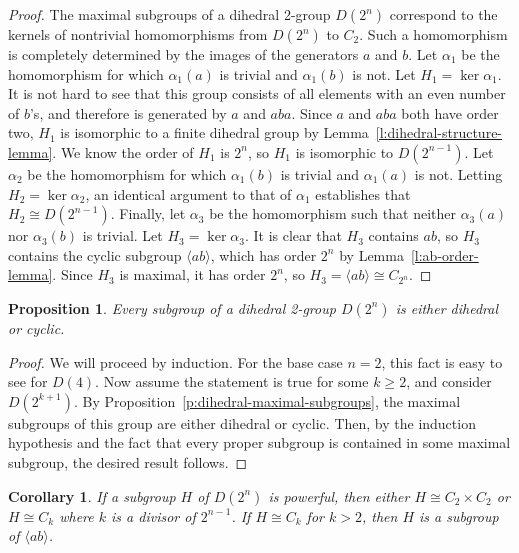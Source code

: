 \documentclass{amsart}
\numberwithin{equation} {section}
\newtheorem{proposition}[equation]{Proposition}
\newtheorem{corollary}[equation]{Corollary}
\theoremstyle{definition}
\begin{document}
\begin{proof}
The maximal subgroups of a dihedral 2-group $D(2^n)$ correspond to  the kernels of nontrivial homomorphisms from $D(2^n)$ to $C_2$. Such a homomorphism is completely determined by the images of the generators $a$ and $b$. Let $\alpha_1$ be the homomorphism for which $\alpha_1(a)$ is trivial and $\alpha_1(b)$ is not. Let $H_1 = \ker \alpha_1$. It is not hard to see that this group consists of all elements with an even number of $b$'s, and therefore is generated by $a$ and $aba$. Since $a$ and $aba$ both have order two, $H_1$ is isomorphic to a finite dihedral group by Lemma~\ref{l:dihedral-structure-lemma}. We know the order of $H_1$ is $2^n$, so $H_1$ is isomorphic to $D(2^{n-1})$. Let $\alpha_2$ be the homomorphism for which $\alpha_1(b)$ is trivial and $\alpha_1(a)$ is not. Letting $H_2 = \ker \alpha_2$, an identical argument to that of $\alpha_1$ establishes that $H_2 \cong D(2^{n-1})$. Finally, let $\alpha_3$ be the homomorphism such that neither $\alpha_3(a)$ nor $\alpha_3(b)$ is trivial. Let $H_3 = \ker \alpha_3$. It is clear that $H_3$ contains $ab$, so $H_3$ contains the cyclic subgroup $\langle ab \rangle$, which has order $2^n$ by Lemma~\ref{l:ab-order-lemma}. Since $H_3$ is maximal, it has order $2^n$, so $H_3 = \langle ab \rangle \cong C_{2^n}$. 
\end{proof}


\begin{proposition}\label{p:dihedral-or-cyclic}
Every subgroup of a dihedral 2-group $D(2^n)$ is either dihedral or cyclic.
\end{proposition}

\begin{proof}
We will proceed by induction. For the base case $n = 2$, this fact is easy to see for $D(4)$. Now assume the statement is true for some $k \geq 2$, and consider $D(2^{k+1})$. By Proposition~\ref{p:dihedral-maximal-subgroups}, the maximal subgroups of this group are either dihedral or cyclic. Then, by the induction hypothesis and the fact that every proper subgroup is contained in some maximal subgroup, the desired result follows. 
\end{proof}


\begin{corollary}\label{c:powerful-isomorphism-types} 
If a subgroup $H$ of $D(2^n)$ is powerful, then either $H\cong C_2\times C_2$ or $H\cong C_k$ where $k $ is a divisor of $2^{n-1}$. If $H \cong C_k$ for $k > 2$, then $H$ is a subgroup of $\langle ab \rangle$. 
\end{corollary}
\end{document}
